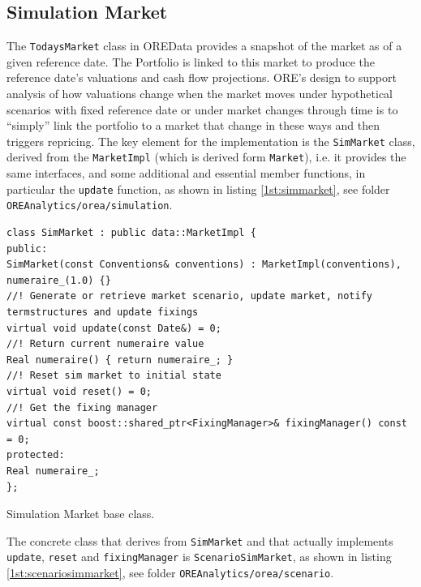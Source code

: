\documentclass[12pt, a4paper]{article}
\begin{document}
\subsection{Simulation Market}
The {\tt TodaysMarket} class in OREData provides a snapshot of the market as of a given reference date. The Portfolio is linked to this market to produce the reference date's valuations and cash flow projections. ORE's design to support analysis of how
valuations change when the market moves under hypothetical scenarios with fixed reference date or under market changes through time is to ``simply'' link the portfolio to a market that change in these ways and then triggers repricing. 
The key element for the implementation is the {\tt SimMarket} class, derived from the {\tt MarketImpl} (which is derived form {\tt Market}), i.e. it provides the same interfaces, and some additional and essential member functions, 
in particular the {\tt update} function, as shown in listing \ref{1st:simmarket}, see folder {\tt OREAnalytics/orea/simulation}.

\begin{listing}[H]
\begin{verbatim}
class SimMarket : public data::MarketImpl {
public:
SimMarket(const Conventions& conventions) : MarketImpl(conventions), numeraire_(1.0) {}
//! Generate or retrieve market scenario, update market, notify termstructures and update fixings
virtual void update(const Date&) = 0;
//! Return current numeraire value
Real numeraire() { return numeraire_; }
//! Reset sim market to initial state
virtual void reset() = 0;
//! Get the fixing manager
virtual const boost::shared_ptr<FixingManager>& fixingManager() const = 0;
protected:
Real numeraire_;
};
\end{verbatim}
\caption{Simulation Market base class.}
\label{1st:simmarket}
\end{listing}

The concrete class that derives from {\tt SimMarket} and that actually implements {\tt update}, {\tt reset} and {\tt fixingManager} is {\tt ScenarioSimMarket}, as shown in listing \ref{1st:scenariosimmarket}, see folder {\tt OREAnalytics/orea/scenario}.
\end{document}
